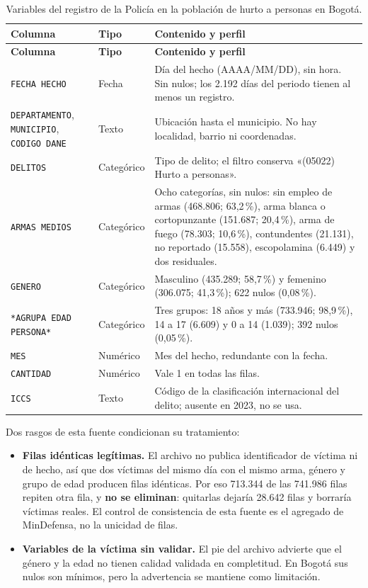 {\small
\setlength{\tabcolsep}{4pt}
\begin{longtable}{@{}>{\raggedright\arraybackslash}p{3.3cm}>{\raggedright\arraybackslash}p{1.8cm}>{\raggedright\arraybackslash}p{10.2cm}@{}}
\caption{Variables del registro de la Policía en la población de hurto a personas en Bogotá.}\label{tab:variables-policia}\\
\toprule
\textbf{Columna} & \textbf{Tipo} & \textbf{Contenido y perfil} \\
\midrule
\endfirsthead
\toprule
\textbf{Columna} & \textbf{Tipo} & \textbf{Contenido y perfil} \\
\midrule
\endhead
\bottomrule
\endfoot
\texttt{FECHA HECHO} & Fecha & Día del hecho (AAAA/MM/DD), sin hora. Sin nulos; los 2.192 días del periodo tienen al menos un registro. \\
\texttt{DEPARTAMENTO}, \texttt{MUNICIPIO}, \texttt{CODIGO DANE} & Texto & Ubicación hasta el municipio. No hay localidad, barrio ni coordenadas. \\
\texttt{DELITOS} & Categórico & Tipo de delito; el filtro conserva «(05022) Hurto a personas». \\
\texttt{ARMAS MEDIOS} & Categórico & Ocho categorías, sin nulos: sin empleo de armas (468.806; 63,2\,\%), arma blanca o cortopunzante (151.687; 20,4\,\%), arma de fuego (78.303; 10,6\,\%), contundentes (21.131), no reportado (15.558), escopolamina (6.449) y dos residuales. \\
\texttt{GENERO} & Categórico & Masculino (435.289; 58,7\,\%) y femenino (306.075; 41,3\,\%); 622 nulos (0,08\,\%). \\
\texttt{*AGRUPA EDAD PERSONA*} & Categórico & Tres grupos: 18 años y más (733.946; 98,9\,\%), 14 a 17 (6.609) y 0 a 14 (1.039); 392 nulos (0,05\,\%). \\
\texttt{MES} & Numérico & Mes del hecho, redundante con la fecha. \\
\texttt{CANTIDAD} & Numérico & Vale 1 en todas las filas. \\
\texttt{ICCS} & Texto & Código de la clasificación internacional del delito; ausente en 2023, no se usa. \\
\end{longtable}
}

Dos rasgos de esta fuente condicionan su tratamiento:
\begin{itemize}
  \item \textbf{Filas idénticas legítimas.} El archivo no publica identificador de víctima ni de hecho, así que dos víctimas del mismo día con el mismo arma, género y grupo de edad producen filas idénticas. Por eso 713.344 de las 741.986 filas repiten otra fila, y \textbf{no se eliminan}: quitarlas dejaría 28.642 filas y borraría víctimas reales. El control de consistencia de esta fuente es el agregado de MinDefensa, no la unicidad de filas.
  \item \textbf{Variables de la víctima sin validar.} El pie del archivo advierte que el género y la edad no tienen calidad validada en completitud. En Bogotá sus nulos son mínimos, pero la advertencia se mantiene como limitación.
\end{itemize}

